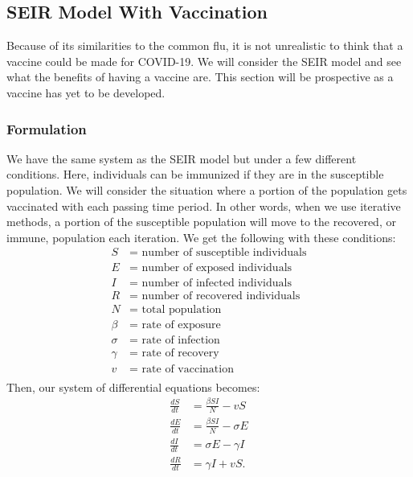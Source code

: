 \documentclass[12pt, a4paper]{article}
\begin{document}
        \subsection{SEIR Model With Vaccination}
        
        Because of its similarities to the common flu, it is not unrealistic to think that a vaccine could be made for COVID-19. We will consider the SEIR model and see what the benefits of having a vaccine are. This section will be prospective as a vaccine has yet to be developed.
        
        \subsubsection{Formulation}
        
        We have the same system as the SEIR model but under a few different conditions. Here, individuals can be immunized if they are in the susceptible population. We will consider the situation where a portion of the population gets vaccinated with each passing time period. In other words, when we use iterative methods, a portion of the susceptible population will move to the recovered, or immune, population each iteration. We get the following with these conditions:
        \begin{align*}
        S &= \text{ number of susceptible individuals}\\
        E &= \text{ number of exposed individuals}\\
        I &= \text{ number of infected individuals}\\
        R &= \text{ number of recovered individuals}\\
        N &= \text{ total population}\\
        \beta &= \text{ rate of exposure}\\
        \sigma &= \text{ rate of infection}\\
        \gamma &= \text{ rate of recovery}\\
        v &= \text{ rate of vaccination}\\
        \end{align*}
        Then, our system of differential equations becomes:
        \begin{align*}
            \frac{dS}{dt} &= \frac{\beta SI}{N} - vS \\
            \frac{dE}{dt} &= \frac{\beta SI}{N} - \sigma E \\
            \frac{dI}{dt} &= \sigma E - \gamma I \\
            \frac{dR}{dt} &= \gamma I + vS.
        \end{align*}
\end{document}
